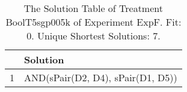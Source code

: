 \begin{table}[ht]
\centering
\begin{tabular}{rp{9cm}}
  \hline
 & Solution \\ 
  \hline
1 & AND(sPair(D2, D4), sPair(D1, D5)) \\ 
   \hline
\end{tabular}
\caption{The Solution Table of Treatment BoolT5sgp005k of Experiment ExpF. Fit: 0. Unique Shortest Solutions: 7.} 
\end{table}
